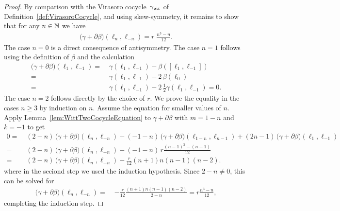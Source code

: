 \begin{proof}
  By comparison with the Virasoro cocycle~${\gamma}_{\mathfrak{vir}}$
  of Definition~\ref{def:VirasoroCocycle}, and using skew-symmetry,
  it remains to show that for any $n \in \mathbb{N}$ we have
  \begin{align*}
    \big( \gamma + \partial \beta \big) (\ell_n , \ell_{-n})
      = r \; \frac{n^3 - n}{12} .
  \end{align*}
  The case $n = 0$ is a direct consequence of antisymmetry.
  The case $n = 1$ follows
  using the definition of $\beta$ and the calculation
  \begin{align*}
    \big( \gamma + \partial \beta \big) (\ell_1 , \ell_{-1})
    = \; & \gamma (\ell_1 , \ell_{-1}) + \beta ([\ell_1,\ell_{-1}]) \\
    = \; & \gamma (\ell_1 , \ell_{-1}) + 2 \, \beta (\ell_0) \\
    = \; & \gamma (\ell_1 , \ell_{-1}) - 2 \, \frac{1}{2} \gamma(\ell_1, \ell_{-1}) = 0 .
  \end{align*}
  The case $n = 2$ follows directly by the choice of $r$.
  We prove the equality in the cases $n \ge 3$ by induction on $n$.
  Assume the equation for smaller values of $n$.
  Apply Lemma~\ref{lem:WittTwoCocycleEquation} to $\gamma + \partial \beta$
  with $m = 1-n$ and $k = -1$ to get
  \begin{align*}
    0 = \; & (2-n) \, \big( \gamma + \partial \beta \big) (\ell_n , \ell_{-n})
           + (-1-n) \, \big( \gamma + \partial \beta \big) (\ell_{1-n} , \ell_{n-1})
           + (2 n - 1) \, \big( \gamma + \partial \beta \big) (\ell_1 , \ell_{-1}) \\
      = \; & (2-n) \, \big( \gamma + \partial \beta \big) (\ell_n , \ell_{-n})
                  - (-1-n) \, r \frac{(n-1)^3 - (n-1)}{12} \\
      = \; & (2-n) \, \big( \gamma + \partial \beta \big) (\ell_n , \ell_{-n})
           + \frac{r}{12} (n+1) n (n-1) (n-2) .
  \end{align*}
  where in the seciond step we used the induction hypothesis. Since $2-n \ne 0$, this can
  be solved for
  \begin{align*}
           \big( \gamma + \partial \beta \big) (\ell_n , \ell_{-n})
    = \; & - \frac{r}{12} \frac{(n+1) n (n-1) (n-2)}{2-n} = r \frac{n^3 - n}{12} ,
  \end{align*}
  completing the induction step.
  \end{proof}

